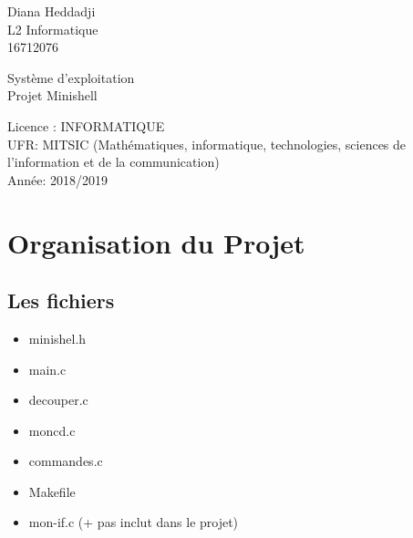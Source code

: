 \documentclass[11pt,a4paper]{report}
\begin{document}
\begin{flushleft}
Diana Heddadji\\
L2 Informatique\\
16712076\\

\end{flushleft}

\vspace{8\baselineskip}

\begin{center}
{\Huge Système d'exploitation}\\
{\Huge Projet Minishell\\}
\end{center}

\vspace{19\baselineskip}


\begin{flushleft}
Licence : INFORMATIQUE\\
UFR: MITSIC (Mathématiques, informatique, technologies, sciences de l'information et de la communication)\\
Année: 2018/2019 \\
\end{flushleft}


\newpage


\section{Organisation du Projet\\}
\subsection{Les fichiers\\}
\begin{itemize}[label=$\square$]
\item minishel.h\\
\item main.c\\
\item decouper.c\\
\item moncd.c\\
\item commandes.c\\
\item Makefile\\
\item mon-if.c (+ pas inclut dans le projet)\\
\end{itemize}
\end{document}
